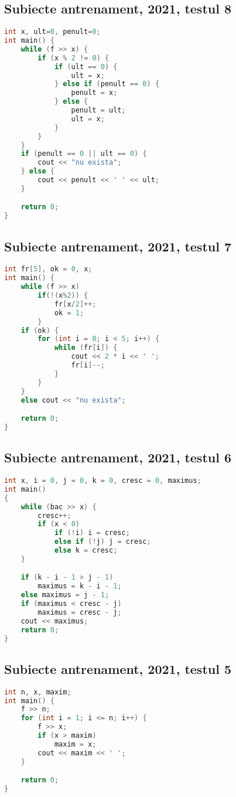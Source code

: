 \documentclass[10pt, a4paper, twocolumn]{article}
\begin{document}
\subsection*{Subiecte antrenament, 2021, testul 8}
\begin{lstlisting}[language=C++]
int x, ult=0, penult=0;
int main() {
    while (f >> x) {
        if (x % 2 != 0) {
            if (ult == 0) {
                ult = x;
            } else if (penult == 0) {
                penult = x;
            } else {
                penult = ult;
                ult = x;
            }
        }
    }
    if (penult == 0 || ult == 0) {
        cout << "nu exista";
    } else {
        cout << penult << ' ' << ult;
    }

    return 0;
}
\end{lstlisting}
\vspace{2.9cm}

\subsection*{Subiecte antrenament, 2021, testul 7}
\begin{lstlisting}[language=C++]
int fr[5], ok = 0, x;
int main() {
    while (f >> x)
        if(!(x%2)) {
            fr[x/2]++;
            ok = 1;
        }
    if (ok) {
        for (int i = 0; i < 5; i++) {
            while (fr[i]) {
                cout << 2 * i << ' ';
                fr[i]--;
            }
        }
    }
    else cout << "nu exista";

    return 0;
}
\end{lstlisting}


\subsection*{Subiecte antrenament, 2021, testul 6}
\begin{lstlisting}[language=C++]
int x, i = 0, j = 0, k = 0, cresc = 0, maximus;
int main()
{
    while (bac >> x) {
        cresc++;
        if (x < 0)
            if (!i) i = cresc;
            else if (!j) j = cresc;
            else k = cresc;
    }

    if (k - i - 1 > j - 1)
        maximus = k - i - 1;
    else maximus = j - 1;
    if (maximus < cresc - j)
        maximus = cresc - j;
    cout << maximus;
    return 0;
}
\end{lstlisting}


\subsection*{Subiecte antrenament, 2021, testul 5}
\begin{lstlisting}[language=C++]
int n, x, maxim;
int main() {
    f >> n;
    for (int i = 1; i <= n; i++) {
        f >> x;
        if (x > maxim)
            maxim = x;
        cout << maxim << ' ';
    }

    return 0;
}
\end{lstlisting}
\end{document}
